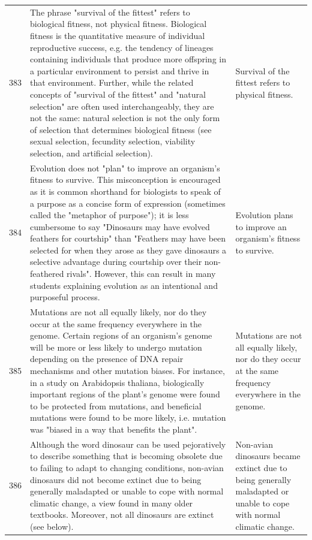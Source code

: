 \begin{tabular}{c|p{}|p{}}
383 & The phrase "survival of the fittest" refers to biological fitness, not physical fitness. Biological fitness is the quantitative measure of individual reproductive success, e.g. the tendency of lineages containing individuals that produce more offspring in a particular environment to persist and thrive in that environment. Further, while the related concepts of "survival of the fittest" and "natural selection" are often used interchangeably, they are not the same: natural selection is not the only form of selection that determines biological fitness (see sexual selection, fecundity selection, viability selection, and artificial selection). & Survival of the fittest refers to physical fitness. \\
384 & Evolution does not "plan" to improve an organism's fitness to survive. This misconception is encouraged as it is common shorthand for biologists to speak of a purpose as a concise form of expression (sometimes called the "metaphor of purpose"); it is less cumbersome to say "Dinosaurs may have evolved feathers for courtship" than "Feathers may have been selected for when they arose as they gave dinosaurs a selective advantage during courtship over their non-feathered rivals". However, this can result in many students explaining evolution as an intentional and purposeful process. & Evolution plans to improve an organism's fitness to survive. \\
385 & Mutations are not all equally likely, nor do they occur at the same frequency everywhere in the genome. Certain regions of an organism's genome will be more or less likely to undergo mutation depending on the presence of DNA repair mechanisms and other mutation biases. For instance, in a study on Arabidopsis thaliana, biologically important regions of the plant's genome were found to be protected from mutations, and beneficial mutations were found to be more likely, i.e. mutation was "biased in a way that benefits the plant". & Mutations are not all equally likely, nor do they occur at the same frequency everywhere in the genome. \\
386 & Although the word dinosaur can be used pejoratively to describe something that is becoming obsolete due to failing to adapt to changing conditions, non-avian dinosaurs did not become extinct due to being generally maladapted or unable to cope with normal climatic change, a view found in many older textbooks. Moreover, not all dinosaurs are extinct (see below). & Non-avian dinosaurs became extinct due to being generally maladapted or unable to cope with normal climatic change. \\

\end{tabular}
